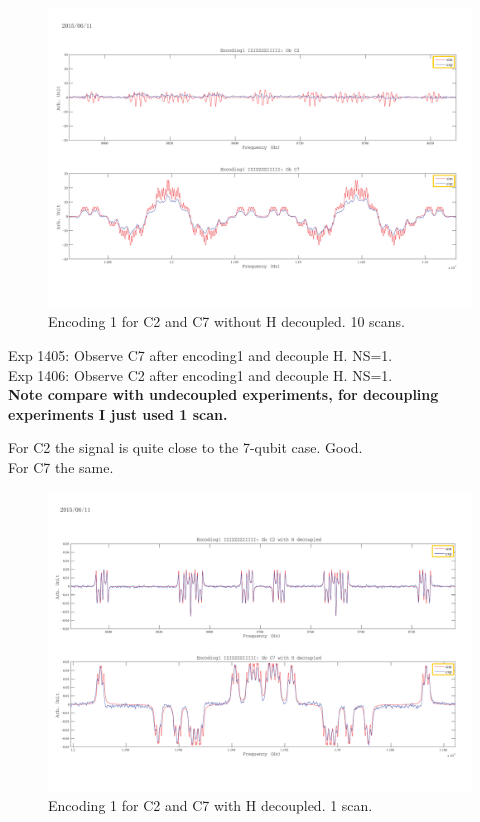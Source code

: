 \begin{figure}[htb]
\begin{center}
\includegraphics[width=\columnwidth]{Encoding1_without_decouple.pdf}
\end{center}
\setlength{\abovecaptionskip}{-0.35cm}
\caption{\footnotesize{Encoding 1 for C2 and C7 without H decoupled. 10 scans.}}\label{1403and1404}
\end{figure}

\clearpage
Exp 1405: Observe C7 after encoding1 and decouple H. NS=1.\\
Exp 1406: Observe C2 after encoding1 and decouple H. NS=1.\\
\textbf{Note compare with undecoupled experiments, for decoupling experiments I just used 1 scan.}

For C2 the signal is quite close to the 7-qubit case. Good.\\
For C7 the same.

\begin{figure}[htb]
\begin{center}
\includegraphics[width=\columnwidth]{Encoding1_with_decouple.pdf}
\end{center}
\setlength{\abovecaptionskip}{-0.35cm}
\caption{\footnotesize{Encoding 1 for C2 and C7 with H decoupled. 1 scan.}}\label{1405and1406}
\end{figure}

